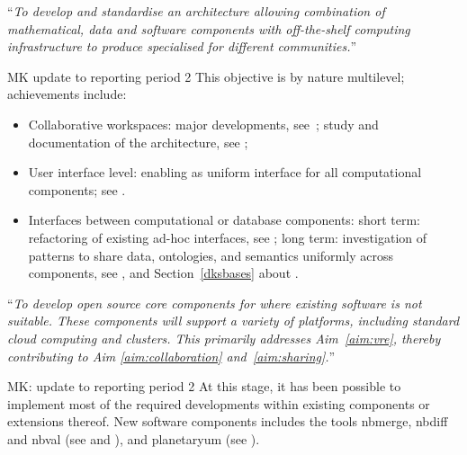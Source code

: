 \begin{compactenum}[\bf O1\rm:]
\item\label{objective:framework} ``\emph{To develop and standardise an architecture
    allowing combination of mathematical, data and software components with off-the-shelf
    computing infrastructure to produce specialised \VREs for different communities.}''

 \begin{oldpart}{MK update to reporting period 2}
  This objective is by nature multilevel; achievements include:
  \begin{itemize}
  \item Collaborative workspaces: major \JupyterHub developments,
    see~; study and documentation of
    the \SMC architecture, see
    ;
  \item User interface level: enabling \Jupyter as uniform interface
    for all computational components; see
    .
  \item Interfaces between computational or database components: short
    term: refactoring of existing ad-hoc interfaces, see
    ; long term: investigation of
    patterns to share data, ontologies, and semantics uniformly across
    components, see
    , and
    Section~\ref{dksbases} about .
  \end{itemize}
\end{oldpart}

\item\label{objectives:core} ``\emph{To develop open source core components
  for \VREs where existing software is not suitable. These components
  will support a variety of platforms, including standard cloud
  computing and clusters. This primarily addresses Aim~\ref{aim:vre},
  thereby contributing to Aim \ref{aim:collaboration}
  and~\ref{aim:sharing}.}''

 \begin{oldpart}{MK: update to reporting period 2}
  At this stage, it has been possible to implement most of the
  required developments within existing components or extensions
  thereof. New software components includes the tools nbmerge, nbdiff and nbval
  (see  and ),
  and planetaryum (see ).
\end{oldpart}


\end{compactenum}
